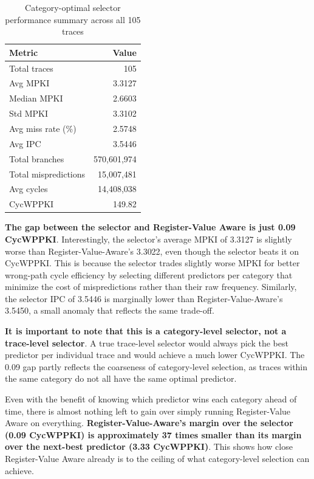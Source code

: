 \documentclass[11pt,a4paper]{article}
\begin{document}
\begin{table}[H]
\centering
\caption{Category-optimal selector performance summary across all 105 traces}
\label{tab:oracle_stats}
\begin{tabular}{lr}
\toprule
\textbf{Metric} & \textbf{Value} \\
\midrule
Total traces         & 105 \\
Avg MPKI             & 3.3127 \\
Median MPKI          & 2.6603 \\
Std MPKI             & 3.3102 \\
Avg miss rate (\%)   & 2.5748 \\
Avg IPC              & 3.5446 \\
Total branches       & 570,601,974 \\
Total mispredictions & 15,007,481 \\
Avg cycles           & 14,408,038 \\
CycWPPKI             & 149.82 \\
\bottomrule
\end{tabular}
\end{table}

\textbf{The gap between the selector and Register-Value Aware is just 0.09 CycWPPKI}.
Interestingly, the selector's average MPKI of 3.3127 is slightly worse than
Register-Value-Aware's 3.3022, even though the selector beats it on CycWPPKI.
This is because the selector trades slightly worse MPKI for better wrong-path
cycle efficiency by selecting different predictors per category that minimize
the cost of mispredictions rather than their raw frequency. Similarly, the
selector IPC of 3.5446 is marginally lower than Register-Value-Aware's 3.5450,
a small anomaly that reflects the same trade-off.

\textbf{It is important to note that this is a category-level selector, not a trace-level
selector}. A true trace-level selector would always pick the best predictor per
individual trace and would achieve a much lower CycWPPKI. The 0.09 gap partly
reflects the coarseness of category-level selection, as traces within the same
category do not all have the same optimal predictor.

Even with the benefit of knowing which predictor wins each category ahead of
time, there is almost nothing left to gain over simply running Register-Value
Aware on everything. \textbf{Register-Value-Aware's margin over the selector (0.09
CycWPPKI) is approximately 37 times smaller than its margin over the next-best
predictor (3.33 CycWPPKI)}. This shows how close Register-Value Aware already
is to the ceiling of what category-level selection can achieve. 
\end{document}
